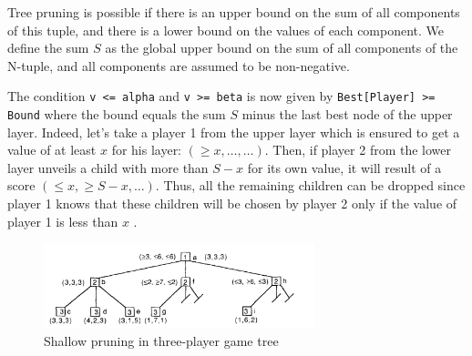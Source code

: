 \documentclass[en]{article}
\newcommand{\py}[1]{\texttt{#1}}
\begin{document}
Tree pruning is possible if there is an upper bound on the sum of all components of this tuple, and there is a lower bound on the values of each component. We define the sum $S$ as the global upper bound on the sum of all components of the N-tuple, and all components are
assumed to be non-negative. 

The condition \py{v <= alpha} and \py{v >= beta} is now given by \py{Best[Player] >= Bound} where the bound equals the sum $S$ minus the last best node of the upper layer. Indeed, let's take a player 1 from the upper layer which is ensured to get a value of at least $x$ for his layer: $(\ge x, \dots, \dots)$. Then, if player 2 from the lower layer unveils a child with more than $S - x$ for its own value, it will result of a score $(\le x, \ge S - x, \dots)$. Thus, all the remaining children can be dropped since player 1 knows that these children will be chosen by player 2 only if the value of player 1 is less than $x$ \cite{multiplayer}.

\begin{figure}[H]
 \centering
 \includegraphics[width=0.7\textwidth]{multiplayer.png}
 \caption{Shallow pruning in three-player game tree \cite{multiplayer}}
 \label{fig:multiplayer}
\end{figure}



\end{document}

